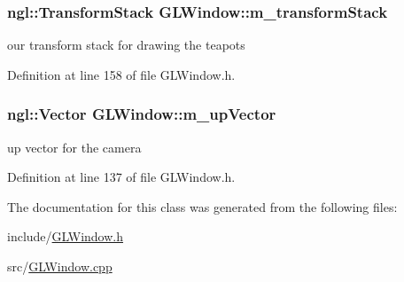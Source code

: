 \hypertarget{class_g_l_window_aaa941adbe7772d03588f312326100e5f}{
\subsubsection[{m\_\-transformStack}]{\setlength{\rightskip}{0pt plus 5cm}ngl::TransformStack {\bf GLWindow::m\_\-transformStack}}}
\label{class_g_l_window_aaa941adbe7772d03588f312326100e5f}


our transform stack for drawing the teapots 



Definition at line 158 of file GLWindow.h.

\hypertarget{class_g_l_window_af2d28904bf4682c2f0cc2ab552f6ae8c}{
\subsubsection[{m\_\-upVector}]{\setlength{\rightskip}{0pt plus 5cm}ngl::Vector {\bf GLWindow::m\_\-upVector}}}
\label{class_g_l_window_af2d28904bf4682c2f0cc2ab552f6ae8c}


up vector for the camera 



Definition at line 137 of file GLWindow.h.



The documentation for this class was generated from the following files:\begin{DoxyCompactItemize}
\item 
include/\hyperlink{_g_l_window_8h}{GLWindow.h}\item 
src/\hyperlink{_g_l_window_8cpp}{GLWindow.cpp}\end{DoxyCompactItemize}
